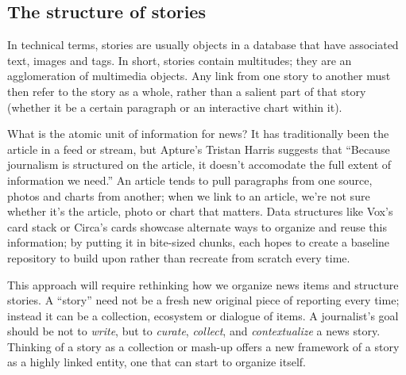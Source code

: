 \subsection{The structure of stories}

In technical terms, stories are usually objects in a database that have associated text, images and tags. In short, stories contain multitudes; they are an agglomeration of multimedia objects. Any link from one story to another must then refer to the story as a whole, rather than a salient part of that story (whether it be a certain paragraph or an interactive chart within it).

What is the atomic unit of information for news? It has traditionally been the article in a feed or stream, but Apture's Tristan Harris suggests that ``Because journalism is structured on the article, it doesn't accomodate the full extent of information we need.'' An article tends to pull paragraphs from one source, photos and charts from another; when we link to an article, we're not sure whether it's the article, photo or chart that matters. Data structures like Vox's card stack or Circa's cards showcase alternate ways to organize and reuse this information; by putting it in bite-sized chunks, each hopes to create a baseline repository to build upon rather than recreate from scratch every time.

This approach will require rethinking how we organize news items and structure stories. A ``story'' need not be a fresh new original piece of reporting every time; instead it can be a collection, ecosystem or dialogue of items. A journalist's goal should be not to \emph{write}, but to \emph{curate}, \emph{collect}, and \emph{contextualize} a news story. Thinking of a story as a collection or mash-up offers a new framework of a story as a highly linked entity, one that can start to organize itself.




